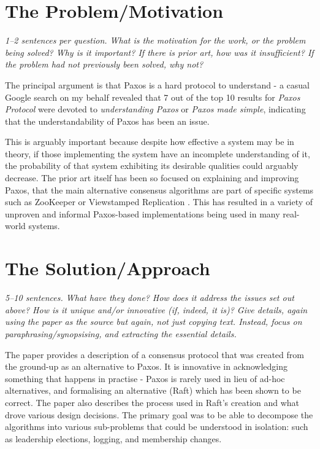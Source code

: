 \documentclass[11pt]{article}
\begin{document}
\section*{The Problem/Motivation}

\textsl{1--2 sentences per question. What is the motivation for the work, or
the problem being solved? Why is it important? If there is prior art, how was
it insufficient? If the problem had not previously been solved, why not?}

The principal argument is that Paxos is a hard protocol to understand - a
casual Google search \cite{PaxosSearch} on my behalf revealed that 7 out of the
top 10 results for \textit{Paxos Protocol} were devoted to
\textit{understanding Paxos} or \textit{Paxos made simple}, indicating that the
understandability of Paxos has been an issue.

This is arguably important because despite how effective a system may be in
theory, if those implementing the system have an incomplete understanding of
it, the probability of that system exhibiting its desirable qualities could
arguably decrease. The prior art itself has been so focused on explaining and
improving Paxos, that the main alternative consensus algorithms are part of
specific systems such as ZooKeeper \cite{ZooKeeper} or Viewstamped Replication
\cite{ViewstampedReplication}. This has resulted in a variety of unproven and
informal Paxos-based implementations being used in many real-world systems.

\section*{The Solution/Approach}

\textsl{5--10 sentences. What have they done? How does it address the issues
set out above? How is it unique and/or innovative (if, indeed, it is)? Give
details, again using the paper as the source but again, not just copying text.
Instead, focus on paraphrasing/synopsising, and extracting the essential
details.}

The paper provides a description of a consensus protocol that was created from
the ground-up as an alternative to Paxos. It is innovative in acknowledging
something that happens in practise - Paxos is rarely used in lieu of ad-hoc
alternatives, and formalising an alternative (Raft) which has been shown to be
correct. The paper also describes the process used in Raft's creation and what
drove various design decisions. The primary goal was to be able to decompose
the algorithms into various sub-problems that could be understood in isolation:
such as leadership elections, logging, and membership changes.
\end{document}
